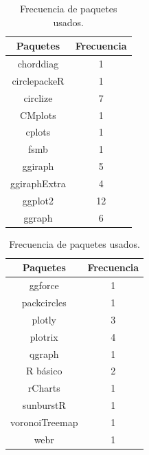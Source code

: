 \documentclass{article}\usepackage[]{graphicx}\usepackage[]{color}
\begin{document}
\begin{table}[h!]
\centering
\begin{tabular}{|c|c|} 
\hline
Paquetes & Frecuencia \\
\hline
 chorddiag & 1 \\
\hline
circlepackeR & 1\\
\hline
circlize & 7\\
\hline
CMplots & 1 \\
\hline
cplots & 1 \\
\hline
fsmb & 1 \\
\hline
ggiraph & 5 \\
\hline
ggiraphExtra & 4 \\
\hline
ggplot2 & 12 \\
\hline
ggraph & 6 \\
\hline
\end{tabular}
\begin{tabular}{|c|c|} 
\hline
Paquetes & Frecuencia \\
\hline
ggforce & 1 \\
\hline
packcircles & 1 \\
\hline
plotly & 3 \\
\hline
plotrix & 4 \\
\hline
qgraph & 1 \\
\hline
R b\'asico & 2 \\
\hline
rCharts & 1 \\
\hline
sunburstR & 1 \\
\hline
voronoiTreemap & 1 \\
\hline
webr & 1 \\
\hline
\end{tabular}
\caption{Frecuencia de paquetes usados.}
\label{table:tabla2}
\end{table}
\end{document}
